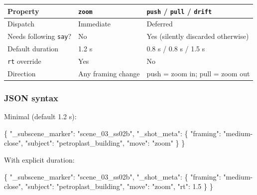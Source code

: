 \documentclass[
  11pt,
]{book}
\newenvironment{Shaded}{}{}
\newcommand{\DataTypeTok}[1]{\textcolor[rgb]{0.56,0.13,0.00}{#1}}
\newcommand{\FloatTok}[1]{\textcolor[rgb]{0.25,0.63,0.44}{#1}}
\newcommand{\FunctionTok}[1]{\textcolor[rgb]{0.02,0.16,0.49}{#1}}
\newcommand{\NormalTok}[1]{#1}
\newcommand{\StringTok}[1]{\textcolor[rgb]{0.25,0.44,0.63}{#1}}
\begin{document}
\begin{longtable}[]{@{}lll@{}}
\toprule\noalign{}
Property & \texttt{zoom} & \texttt{push} / \texttt{pull} / \texttt{drift} \\
\midrule\noalign{}
\endhead
\bottomrule\noalign{}
\endlastfoot
Dispatch & Immediate & Deferred \\
Needs following \texttt{say}? & No & Yes (silently discarded otherwise) \\
Default duration & 1.2 s & 0.8 s / 0.8 s / 1.5 s \\
\texttt{rt} override & Yes & No \\
Direction & Any framing change & push = zoom in; pull = zoom out \\
\end{longtable}

\subsubsection{JSON syntax}\label{zoom-json-syntax}

Minimal (default 1.2 s):

\begin{Shaded}
\begin{Highlighting}[]
\FunctionTok{\{}
\NormalTok{  }\DataTypeTok{"\_subscene\_marker"}\NormalTok{: }\StringTok{"scene\_03\_ss02b"}\NormalTok{,}
\NormalTok{  }\DataTypeTok{"\_shot\_meta"}\NormalTok{: \{}
\NormalTok{    }\DataTypeTok{"framing"}\NormalTok{:  }\StringTok{"medium-close"}\NormalTok{,}
\NormalTok{    }\DataTypeTok{"subject"}\NormalTok{:  }\StringTok{"petroplast\_building"}\NormalTok{,}
\NormalTok{    }\DataTypeTok{"move"}\NormalTok{:     }\StringTok{"zoom"}
\NormalTok{  \}}
\FunctionTok{\}}
\end{Highlighting}
\end{Shaded}

With explicit duration:

\begin{Shaded}
\begin{Highlighting}[]
\FunctionTok{\{}
\NormalTok{  }\DataTypeTok{"\_subscene\_marker"}\NormalTok{: }\StringTok{"scene\_03\_ss02b"}\NormalTok{,}
\NormalTok{  }\DataTypeTok{"\_shot\_meta"}\NormalTok{: \{}
\NormalTok{    }\DataTypeTok{"framing"}\NormalTok{:  }\StringTok{"medium-close"}\NormalTok{,}
\NormalTok{    }\DataTypeTok{"subject"}\NormalTok{:  }\StringTok{"petroplast\_building"}\NormalTok{,}
\NormalTok{    }\DataTypeTok{"move"}\NormalTok{:     }\StringTok{"zoom"}\NormalTok{,}
\NormalTok{    }\DataTypeTok{"rt"}\NormalTok{:       }\FloatTok{1.5}
\NormalTok{  \}}
\FunctionTok{\}}
\end{Highlighting}
\end{Shaded}
\end{document}

